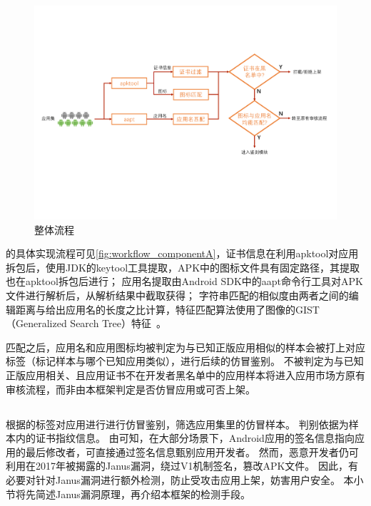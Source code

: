 \begin{figure}[htbp]
    \centering
    \includegraphics[width=\textwidth]{./Figures/edwin-component-A}
    \caption{\componentA 整体流程}
    \label{fig:workflow_componentA}
    \vspace{-3mm}
\end{figure}

\componentA 的具体实现流程可见\autoref{fig:workflow_componentA}，证书信息在利用apktool对应用拆包后，使用JDK的keytool工具提取，APK中的图标文件具有固定路径，其提取也在apktool拆包后进行；
应用名提取由Android SDK中的aapt命令行工具对APK文件进行解析后，从解析结果中截取获得；
字符串匹配的相似度由两者之间的编辑距离与给出应用名的长度之比计算，特征匹配算法使用了图像的GIST（Generalized Search Tree）特征~\cite{torralba2003context}。

匹配之后，应用名和应用图标均被判定为与已知正版应用相似的样本会被打上对应标签（标记样本与哪个已知应用类似），进行后续的仿冒鉴别。
不被\componentA 判定为与已知正版应用相关、且应用证书不在开发者黑名单中的应用样本将进入应用市场方原有审核流程，而非由本框架判定是否仿冒应用或可否上架。

\subsection{\componentB }
\componentB 根据\componentA 的标签对应用进行进行仿冒鉴别，筛选应用集里的仿冒样本。
判别依据为样本内的证书指纹信息。
由可知，在大部分场景下，Android应用的签名信息指向应用的最后修改者，可直接通过签名信息甄别应用开发者。
然而，恶意开发者仍可利用在2017年被揭露的Janus漏洞，绕过V1机制签名，篡改APK文件。
因此，有必要对针对Janus漏洞进行额外检测，防止受攻击应用上架，妨害用户安全。
本小节将先简述Janus漏洞原理，再介绍本框架的检测手段。

